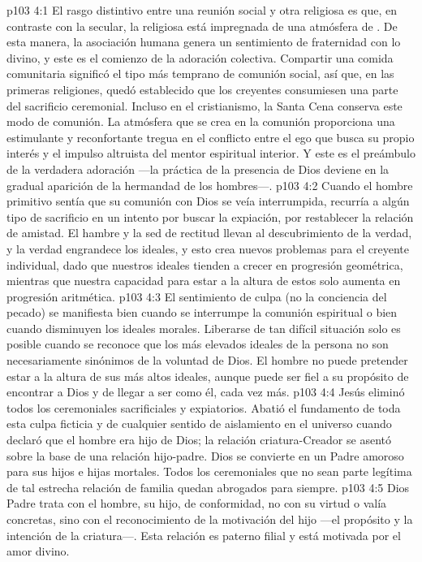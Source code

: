 \vs p103 4:1 El rasgo distintivo entre una reunión social y otra religiosa es que, en contraste con la secular, la religiosa está impregnada de una atmósfera de . De esta manera, la asociación humana genera un sentimiento de fraternidad con lo divino, y este es el comienzo de la adoración colectiva. Compartir una comida comunitaria significó el tipo más temprano de comunión social, así que, en las primeras religiones, quedó establecido que los creyentes consumiesen una parte del sacrificio ceremonial. Incluso en el cristianismo, la Santa Cena conserva este modo de comunión. La atmósfera que se crea en la comunión proporciona una estimulante y reconfortante tregua en el conflicto entre el ego que busca su propio interés y el impulso altruista del mentor espiritual interior. Y este es el preámbulo de la verdadera adoración ---la práctica de la presencia de Dios deviene en la gradual aparición de la hermandad de los hombres---.
\vs p103 4:2 Cuando el hombre primitivo sentía que su comunión con Dios se veía interrumpida, recurría a algún tipo de sacrificio en un intento por buscar la expiación, por restablecer la relación de amistad. El hambre y la sed de rectitud llevan al descubrimiento de la verdad, y la verdad engrandece los ideales, y esto crea nuevos problemas para el creyente individual, dado que nuestros ideales tienden a crecer en progresión geométrica, mientras que nuestra capacidad para estar a la altura de estos solo aumenta en progresión aritmética.
\vs p103 4:3 El sentimiento de culpa (no la conciencia del pecado) se manifiesta bien cuando se interrumpe la comunión espiritual o bien cuando disminuyen los ideales morales. Liberarse de tan difícil situación solo es posible cuando se reconoce que los más elevados ideales de la persona no son necesariamente sinónimos de la voluntad de Dios. El hombre no puede pretender estar a la altura de sus más altos ideales, aunque puede ser fiel a su propósito de encontrar a Dios y de llegar a ser como él, cada vez más.
\vs p103 4:4 Jesús eliminó todos los ceremoniales sacrificiales y expiatorios. Abatió el fundamento de toda esta culpa ficticia y de cualquier sentido de aislamiento en el universo cuando declaró que el hombre era hijo de Dios; la relación criatura\hyp{}Creador se asentó sobre la base de una relación hijo\hyp{}padre. Dios se convierte en un Padre amoroso para sus hijos e hijas mortales. Todos los ceremoniales que no sean parte legítima de tal estrecha relación de familia quedan abrogados para siempre.
\vs p103 4:5 Dios Padre trata con el hombre, su hijo, de conformidad, no con su virtud o valía concretas, sino con el reconocimiento de la motivación del hijo ---el propósito y la intención de la criatura---. Esta relación es paterno filial y está motivada por el amor divino.
